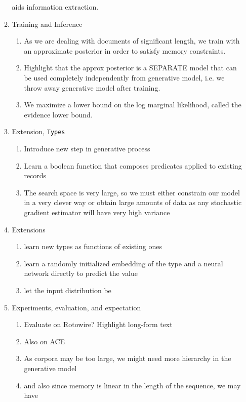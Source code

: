 \documentclass[11pt]{article}
\begin{document}
\begin{enumerate}
\begin{enumerate}
        aids information extraction.
    \item Training and Inference
        \begin{enumerate}
        \item As we are dealing with documents of significant length,
            we train with an approximate posterior in order to satisfy memory constraints.
        \item Highlight that the approx posterior is a SEPARATE model
            that can be used completely independently from generative model,
            i.e. we throw away generative model after training.
        \item We maximize a lower bound on the log marginal likelihood,
            called the evidence lower bound.
        \end{enumerate}
    \item Extension, \texttt{Types}
        \begin{enumerate}
        \item Introduce new step in generative process
        \item Learn a boolean function that composes predicates applied to existing
            records
        \item The search space is very large, so we must either constrain our model 
            in a very clever way or obtain 
            large amounts of data as any stochastic gradient estimator will have very high variance
        \end{enumerate}
    \item Extensions
        \begin{enumerate}
        \item learn new types as functions of existing ones
        \item learn a randomly initialized embedding of the type
            and a neural network directly to predict the value
        \item let the input distribution be 
        \end{enumerate}
    \item Experiments, evaluation, and expectation
        \begin{enumerate}
        \item Evaluate on Rotowire? Highlight long-form text
        \item Also on ACE
        \item As corpora may be too large, we might need more hierarchy in the generative model
        \item and also since memory is linear in the length of the sequence, we may have

\end{enumerate}
\end{enumerate}
\end{enumerate}
\end{document}
